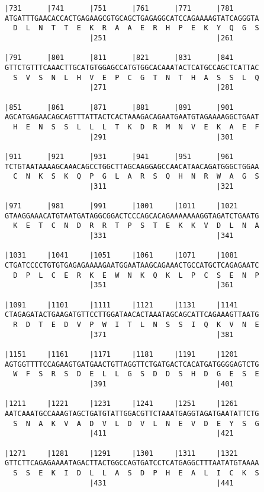 \documentclass{article}
\begin{document}
\begin{Verbatim}
|731      |741      |751      |761      |771      |781      
ATGATTTGAACACCACTGAGAAGCGTGCAGCTGAGAGGCATCCAGAAAAGTATCAGGGTA
  D  L  N  T  T  E  K  R  A  A  E  R  H  P  E  K  Y  Q  G  S
                    |251                          |261      
  
|791      |801      |811      |821      |831      |841      
GTTCTGTTTCAAACTTGCATGTGGAGCCATGTGGCACAAATACTCATGCCAGCTCATTAC
  S  V  S  N  L  H  V  E  P  C  G  T  N  T  H  A  S  S  L  Q
                    |271                          |281      
  
|851      |861      |871      |881      |891      |901      
AGCATGAGAACAGCAGTTTATTACTCACTAAAGACAGAATGAATGTAGAAAAGGCTGAAT
  H  E  N  S  S  L  L  L  T  K  D  R  M  N  V  E  K  A  E  F
                    |291                          |301      
  
|911      |921      |931      |941      |951      |961      
TCTGTAATAAAAGCAAACAGCCTGGCTTAGCAAGGAGCCAACATAACAGATGGGCTGGAA
  C  N  K  S  K  Q  P  G  L  A  R  S  Q  H  N  R  W  A  G  S
                    |311                          |321      
  
|971      |981      |991      |1001     |1011     |1021     
GTAAGGAAACATGTAATGATAGGCGGACTCCCAGCACAGAAAAAAAGGTAGATCTGAATG
  K  E  T  C  N  D  R  R  T  P  S  T  E  K  K  V  D  L  N  A
                    |331                          |341      
  
|1031     |1041     |1051     |1061     |1071     |1081     
CTGATCCCCTGTGTGAGAGAAAAGAATGGAATAAGCAGAAACTGCCATGCTCAGAGAATC
  D  P  L  C  E  R  K  E  W  N  K  Q  K  L  P  C  S  E  N  P
                    |351                          |361      
  
|1091     |1101     |1111     |1121     |1131     |1141     
CTAGAGATACTGAAGATGTTCCTTGGATAACACTAAATAGCAGCATTCAGAAAGTTAATG
  R  D  T  E  D  V  P  W  I  T  L  N  S  S  I  Q  K  V  N  E
                    |371                          |381      
  
|1151     |1161     |1171     |1181     |1191     |1201     
AGTGGTTTTCCAGAAGTGATGAACTGTTAGGTTCTGATGACTCACATGATGGGGAGTCTG
  W  F  S  R  S  D  E  L  L  G  S  D  D  S  H  D  G  E  S  E
                    |391                          |401      
  
|1211     |1221     |1231     |1241     |1251     |1261     
AATCAAATGCCAAAGTAGCTGATGTATTGGACGTTCTAAATGAGGTAGATGAATATTCTG
  S  N  A  K  V  A  D  V  L  D  V  L  N  E  V  D  E  Y  S  G
                    |411                          |421      
  
|1271     |1281     |1291     |1301     |1311     |1321     
GTTCTTCAGAGAAAATAGACTTACTGGCCAGTGATCCTCATGAGGCTTTAATATGTAAAA
  S  S  E  K  I  D  L  L  A  S  D  P  H  E  A  L  I  C  K  S
                    |431                          |441      
  

\end{Verbatim}
\end{document}
